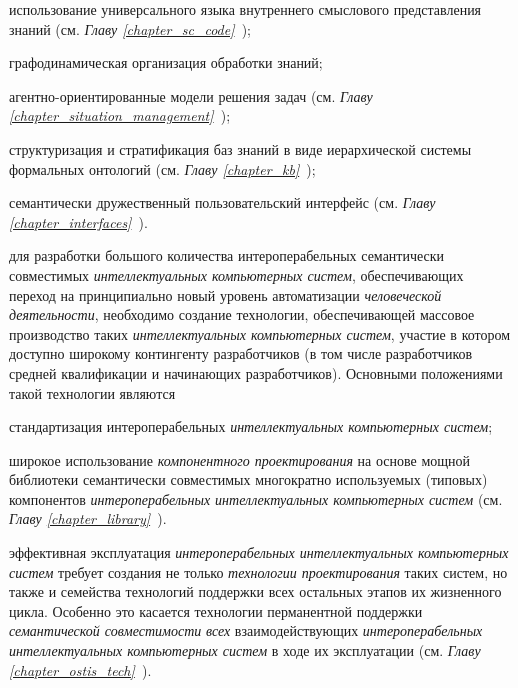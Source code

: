 \begin{textitemize}
\begin{textitemize}
		\item использование универсального языка внутреннего смыслового представления знаний (см. \textit{Главу \ref{chapter_sc_code}~});
		\item графодинамическая организация обработки знаний;
		\item агентно-ориентированные модели решения задач (см. \textit{Главу \ref{chapter_situation_management}~});
		\item структуризация и стратификация баз знаний в виде иерархической системы формальных онтологий (см. \textit{Главу \ref{chapter_kb}~});
		\item семантически дружественный пользовательский интерфейс (см. \textit{Главу \ref{chapter_interfaces}~}).
	\end{textitemize}
	\item для разработки большого количества интероперабельных семантически совместимых \textit{интеллектуальных компьютерных систем}, обеспечивающих переход на принципиально новый уровень автоматизации \textit{человеческой деятельности}, необходимо создание технологии, обеспечивающей массовое производство таких \textit{интеллектуальных компьютерных систем}, участие в котором доступно широкому контингенту разработчиков (в том числе разработчиков средней квалификации и начинающих разработчиков). Основными положениями такой технологии являются
	\begin{textitemize}
		\item стандартизация интероперабельных \textit{интеллектуальных компьютерных систем};
		\item широкое использование \textit{компонентного проектирования} на основе мощной библиотеки семантически совместимых многократно используемых (типовых) компонентов \textit{интероперабельных интеллектуальных компьютерных систем} (см. \textit{Главу \ref{chapter_library}~}).
	\end{textitemize}
	\item эффективная эксплуатация \textit{интероперабельных интеллектуальных компьютерных систем} требует создания не только \textit{технологии проектирования} таких систем, но также и семейства технологий поддержки всех остальных этапов их жизненного цикла. Особенно это касается технологии перманентной поддержки \textit{семантической совместимости} \textit{всех} взаимодействующих \textit{интероперабельных интеллектуальных компьютерных систем} в ходе их эксплуатации (см. \textit{Главу \ref{chapter_ostis_tech}~}).
\end{textitemize}

%